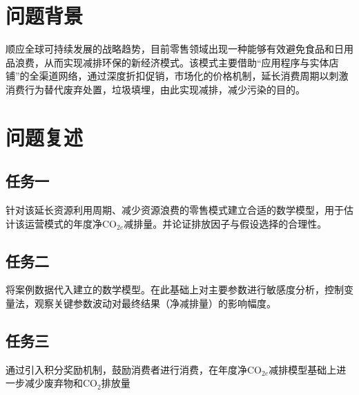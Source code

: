 \documentclass{article}
\begin{document}
\section{问题背景}

顺应全球可持续发展的战略趋势，目前零售领域出现一种能够有效避免食品和日用品浪费，从而实现减排环保的新经济模式。该模式主要借助“应用程序与实体店铺”的全渠道网络，通过深度折扣促销，市场化的价格机制，延长消费周期以刺激消费行为替代废弃处置，垃圾填埋，由此实现减排，减少污染的目的。
\section{问题复述}

\subsection{任务一}

针对该延长资源利用周期、减少资源浪费的零售模式建立合适的数学模型，用于估计该运营模式的年度净$\mathrm{CO}_{2e}$减排量。并论证排放因子与假设选择的合理性。

\subsection{任务二}

将案例数据代入建立的数学模型。在此基础上对主要参数进行敏感度分析，控制变量法，观察关键参数波动对最终结果（净减排量）的影响幅度。
\subsection{任务三}%

通过引入积分奖励机制，鼓励消费者进行消费，在年度净$\mathrm{CO}_{2e}$减排模型基础上进一步减少废弃物和$\mathrm{CO}_2$排放量
\end{document}
